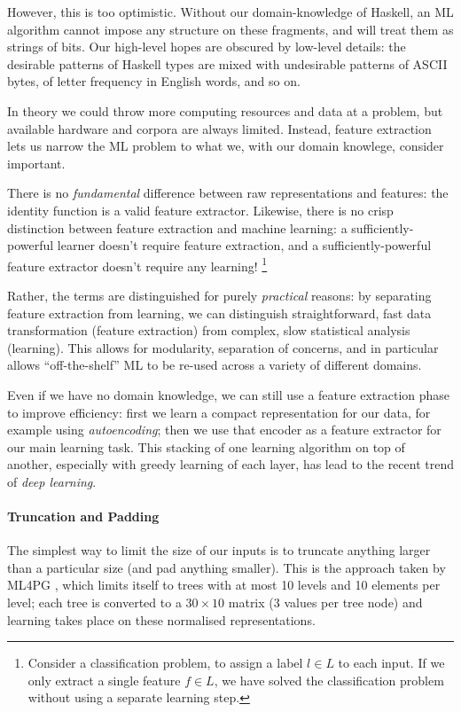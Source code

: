 However, this is too optimistic. Without our domain-knowledge of Haskell, an ML algorithm cannot impose any structure on these fragments, and will treat them as strings of bits. Our high-level hopes are obscured by low-level details: the desirable patterns of Haskell types are mixed with undesirable patterns of ASCII bytes, of letter frequency in English words, and so on.

In theory we could throw more computing resources and data at a problem, but available hardware and corpora are always limited. Instead, feature extraction lets us narrow the ML problem to what we, with our domain knowlege, consider important.

There is no \emph{fundamental} difference between raw representations and features: the identity function is a valid feature extractor. Likewise, there is no crisp distinction between feature extraction and machine learning: a sufficiently-powerful learner doesn't require feature extraction, and a sufficiently-powerful feature extractor doesn't require any learning! \footnote{Consider a classification problem, to assign a label $l \in L$ to each input. If we only extract a single feature $f \in L$, we have solved the classification problem without using a separate learning step.}

Rather, the terms are distinguished for purely \emph{practical} reasons: by separating feature extraction from learning, we can distinguish straightforward, fast data transformation (feature extraction) from complex, slow statistical analysis (learning). This allows for modularity, separation of concerns, and in particular allows ``off-the-shelf'' ML to be re-used across a variety of different domains.

Even if we have no domain knowledge, we can still use a feature extraction phase to improve efficiency: first we learn a compact representation for our data, for example using \emph{autoencoding}; then we use that encoder as a feature extractor for our main learning task. This stacking of one learning algorithm on top of another, especially with greedy learning of each layer, has lead to the recent trend of \emph{deep learning}.

\paragraph{Truncation and Padding}

The simplest way to limit the size of our inputs is to truncate anything larger than a particular size (and pad anything smaller). This is the approach taken by ML4PG \citep{journals/corr/abs-1302-6421}, which limits itself to trees with at most 10 levels and 10 elements per level; each tree is converted to a $30 \times 10$ matrix (3 values per tree node) and learning takes place on these normalised representations.

